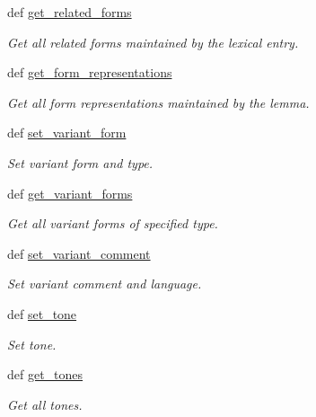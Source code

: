 \begin{DoxyCompactItemize}
def \hyperlink{classlmf_1_1src_1_1core_1_1lexical__entry_1_1_lexical_entry_aee5b118b1015a35a5e8426235d325291}{get\+\_\+related\+\_\+forms}
\begin{DoxyCompactList}\small\item\em Get all related forms maintained by the lexical entry. \end{DoxyCompactList}\item 
def \hyperlink{classlmf_1_1src_1_1core_1_1lexical__entry_1_1_lexical_entry_a62717ccb205bcbea9a421cbc562068ce}{get\+\_\+form\+\_\+representations}
\begin{DoxyCompactList}\small\item\em Get all form representations maintained by the lemma. \end{DoxyCompactList}\item 
def \hyperlink{classlmf_1_1src_1_1core_1_1lexical__entry_1_1_lexical_entry_ab5ec3863b9c8623df7f41ad07332b2ec}{set\+\_\+variant\+\_\+form}
\begin{DoxyCompactList}\small\item\em Set variant form and type. \end{DoxyCompactList}\item 
def \hyperlink{classlmf_1_1src_1_1core_1_1lexical__entry_1_1_lexical_entry_a32a47f7dd435da7c5e06799fdee7d094}{get\+\_\+variant\+\_\+forms}
\begin{DoxyCompactList}\small\item\em Get all variant forms of specified type. \end{DoxyCompactList}\item 
def \hyperlink{classlmf_1_1src_1_1core_1_1lexical__entry_1_1_lexical_entry_a150a57b434161d86b8962b3ef7f0ff51}{set\+\_\+variant\+\_\+comment}
\begin{DoxyCompactList}\small\item\em Set variant comment and language. \end{DoxyCompactList}\item 
def \hyperlink{classlmf_1_1src_1_1core_1_1lexical__entry_1_1_lexical_entry_ad816834c160783393a4a60a71431886b}{set\+\_\+tone}
\begin{DoxyCompactList}\small\item\em Set tone. \end{DoxyCompactList}\item 
def \hyperlink{classlmf_1_1src_1_1core_1_1lexical__entry_1_1_lexical_entry_a5527aa1541a398941192ef5a5d400e8e}{get\+\_\+tones}
\begin{DoxyCompactList}\small\item\em Get all tones. \end{DoxyCompactList}\item 

\end{DoxyCompactItemize}
